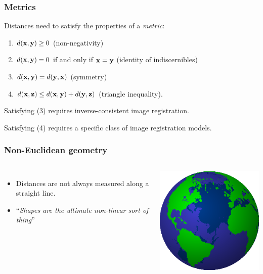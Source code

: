 \documentclass{beamer}
\begin{document}
\begin{frame}
\frametitle{Metrics}
Distances need to satisfy the properties of a \emph{metric}:
\begin{enumerate}
\item $d({\bf x}, {\bf y}) \ge 0$ (non-negativity)
\item $d({\bf x}, {\bf y}) = 0$ if and only if ${\bf x} = {\bf y}$ (identity of indiscernibles)
\item $d({\bf x}, {\bf y}) = d({\bf y}, {\bf x})$ (symmetry)
\item $d({\bf x}, {\bf z}) \le d({\bf x}, {\bf y}) + d({\bf y}, {\bf z})$ (triangle inequality).
\end{enumerate}

Satisfying (3) requires inverse-consistent image registration.

Satisfying (4) requires a specific class of image registration models.
\end{frame}


\begin{frame}
\frametitle{Non-Euclidean geometry}
\begin{columns}[c]
\begin{itemize}
\item Distances are not always measured along a straight line.
\item ``\emph{Shapes are the ultimate non-linear sort of thing}''
\end{itemize}
\includegraphics[width=\textwidth]{Globe}
\end{columns}
\end{frame}
\end{document}
